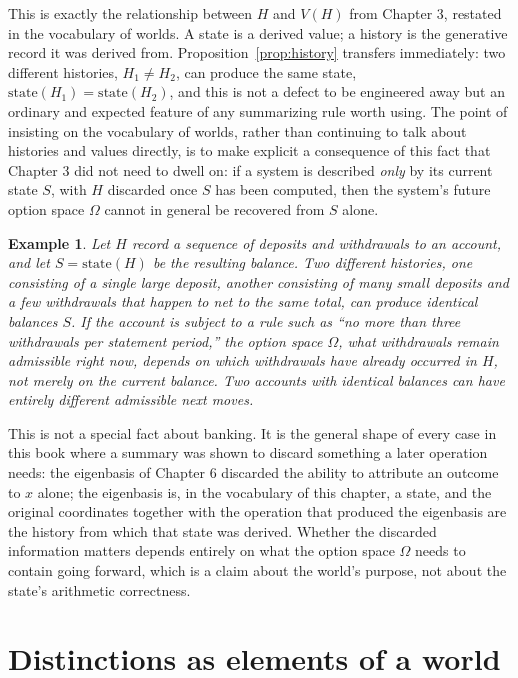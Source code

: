 \documentclass[11pt]{book}
\newtheorem{example}[theorem]{Example}
\begin{document}
This is exactly the relationship between $H$ and $V(H)$ from Chapter 3, restated in the vocabulary of worlds. A state is a derived value; a history is the generative record it was derived from. Proposition~\ref{prop:history} transfers immediately: two different histories, $H_1\ne H_2$, can produce the same state, $\mathrm{state}(H_1)=\mathrm{state}(H_2)$, and this is not a defect to be engineered away but an ordinary and expected feature of any summarizing rule worth using. The point of insisting on the vocabulary of worlds, rather than continuing to talk about histories and values directly, is to make explicit a consequence of this fact that Chapter 3 did not need to dwell on: if a system is described \emph{only} by its current state $S$, with $H$ discarded once $S$ has been computed, then the system's future option space $\Omega$ cannot in general be recovered from $S$ alone.

\begin{example}
Let $H$ record a sequence of deposits and withdrawals to an account, and let $S=\mathrm{state}(H)$ be the resulting balance. Two different histories, one consisting of a single large deposit, another consisting of many small deposits and a few withdrawals that happen to net to the same total, can produce identical balances $S$. If the account is subject to a rule such as ``no more than three withdrawals per statement period,'' the option space $\Omega$, what withdrawals remain admissible right now, depends on which withdrawals have already occurred in $H$, not merely on the current balance. Two accounts with identical balances can have entirely different admissible next moves.
\end{example}

This is not a special fact about banking. It is the general shape of every case in this book where a summary was shown to discard something a later operation needs: the eigenbasis of Chapter 6 discarded the ability to attribute an outcome to $x$ alone; the eigenbasis is, in the vocabulary of this chapter, a state, and the original coordinates together with the operation that produced the eigenbasis are the history from which that state was derived. Whether the discarded information matters depends entirely on what the option space $\Omega$ needs to contain going forward, which is a claim about the world's purpose, not about the state's arithmetic correctness.

\section{Distinctions as elements of a world}
\end{document}
